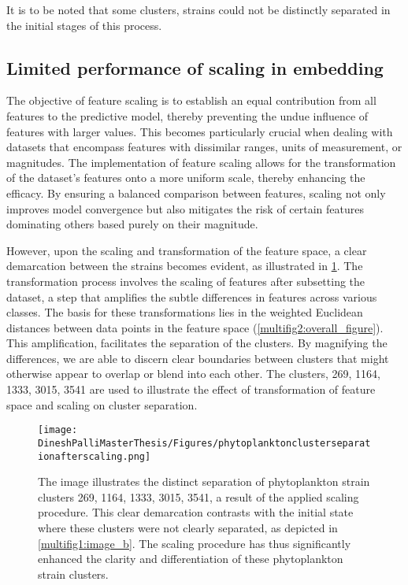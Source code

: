 \documentclass[12pt,a4paper]{article}
\begin{document}
It is to be noted that some clusters, strains could not be distinctly separated in the initial stages of this process.

\subsection{Limited performance of scaling in embedding}
The objective of feature scaling is to establish an equal contribution from all features to the predictive model, thereby preventing the undue influence of features with larger values. This becomes particularly crucial when dealing with datasets that encompass features with dissimilar ranges, units of measurement, or magnitudes. The implementation of feature scaling allows for the transformation of the dataset’s features onto a more uniform scale, thereby enhancing the efficacy. By ensuring a balanced comparison between features, scaling not only improves model convergence but also mitigates the risk of certain features dominating others based purely on their magnitude.

However, upon the scaling and transformation of the feature space, a clear demarcation between the strains becomes evident, as illustrated in \ref{clustersafterscaling}. The transformation process involves the scaling of features after subsetting the dataset, a step that amplifies the subtle differences in features across various classes. The basis for these transformations lies in the weighted Euclidean distances between data points in the feature space (\ref{multifig2:overall_figure}). This amplification, facilitates the separation of the clusters. By magnifying the differences, we are able to discern clear boundaries between clusters that might otherwise appear to overlap or blend into each other. The clusters, 269, 1164, 1333, 3015, 3541 are used to illustrate the effect of transformation of feature space and scaling on cluster separation.

\begin{figure}
  \centering
  \texttt{[image: DineshPalliMasterThesis/Figures/phytoplanktonclusterseparationafterscaling.png]}
  \caption[Illustration depicting how scaling affects clustering]{The image illustrates the distinct separation of phytoplankton strain clusters 269, 1164, 1333, 3015, 3541, a result of the applied scaling procedure. This clear demarcation contrasts with the initial state where these clusters were not clearly separated, as depicted in \ref{multifig1:image_b}. The scaling procedure has thus significantly enhanced the clarity and differentiation of these phytoplankton strain clusters.}
  \label{clustersafterscaling}
\end{figure}
\end{document}
